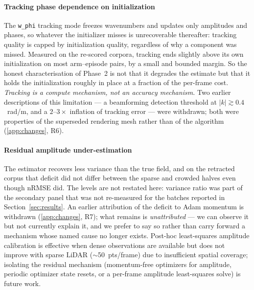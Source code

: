 \documentclass[review]{elsarticle}
\begin{document}
\paragraph{Tracking phase dependence on initialization}
The \texttt{w\_phi} tracking mode freezes wavenumbers and updates only amplitudes
and phases, so whatever the initializer misses is unrecoverable thereafter: tracking
quality is capped by initialization quality, regardless of why a component was
missed. Measured on the re-scored corpora, tracking ends slightly above its own
initialization on most arm--episode pairs, by a small and bounded margin. So the
honest characterisation of Phase~2 is not that it degrades the estimate but that it
holds the initialization roughly in place at a fraction of the per-frame cost.
\emph{Tracking is a compute mechanism, not an accuracy mechanism.} Two earlier
descriptions of this limitation --- a beamforming detection threshold at
$|k|\gtrsim 0.4$~rad/m, and a $2$--$3\times$ inflation of tracking error --- were
withdrawn; both were properties of the superseded rendering mesh rather than of the
algorithm (\ref{app:changes}, R6).

\paragraph{Residual amplitude under-estimation}
The estimator recovers less variance
than the true field, and on the retracted corpus that deficit did not differ between
the sparse and crowded halves even though nRMSE did. The levels are not restated
here: variance ratio was part of the secondary panel that was not re-measured for
the batches reported in Section~\ref{sec:results}. An earlier attribution of the
deficit to Adam momentum is withdrawn (\ref{app:changes}, R7); what remains is
\emph{unattributed} --- we can observe it but not currently explain it, and we prefer
to say so rather than carry forward a mechanism whose named cause no longer exists.
Post-hoc
least-squares amplitude calibration is effective when dense observations
are available but does not improve with sparse LiDAR ($\sim$50~pts/frame)
due to insufficient spatial coverage; isolating the residual mechanism
(momentum-free optimizers for amplitude, periodic optimizer state resets,
or a per-frame amplitude least-squares solve) is future work.
\end{document}
